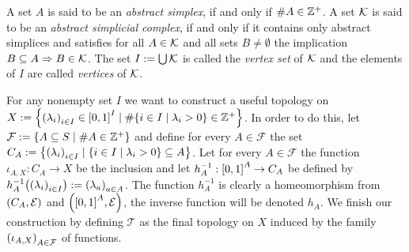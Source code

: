 \begin{definition}
	A set $A$ is said to be an \textit{abstract simplex}, if and only if $\# A \in \Z^+$. A set $\abcom$ is said to be an \textit{abstract simplicial complex}, if and only if it contains only abstract simplices and satisfies for all $A \in \abcom$ and all sets $B \neq \emptyset$ the implication $B \subseteq A \Rightarrow B \in \abcom$. The set $I := \bigcup \abcom$ is called the \textit{vertex set} of $\abcom$ and the elements of $I$ are called \textit{vertices} of $\abcom$. 
\end{definition}


\begin{example}\label{example:top_on_prod}
 	For any nonempty set $I$ we want to construct a useful topology on $X:= \Bbraces{\pbraces{\lambda_i}_{i \in I} \in \bbraces{0,1}^I \mid \card{\Bbraces{i \in I \mid \lambda_i > 0}} \in \Z^+}$. In order to do this, let $\mathcal{F} := \Bbraces{A \subseteq S \mid \card{A} \in \Z^+}$ and define for every $A \in \mathcal{F}$ the set $C_A := \Bbraces{\pbraces{\lambda_i}_{i \in I} \mid \Bbraces{i \in I \mid \lambda_i > 0} \subseteq A}$. Let for every $A \in \mathcal{F}$ the function $\iota_{A,X}: C_A \to X$ be the inclusion and let $h_A^{-1}: \bbraces{0,1}^A \to C_A$ be defined by $h_A^{-1}\pbraces{\pbraces{\lambda_i}_{i \in I}} := \pbraces{\lambda_a}_{a \in A}$. The function $h_A^{-1}$ is clearly a homeomorphism from $\eucl[C_A]$ and $\eucl[\bbraces{0,1}^A]$, the inverse function will be denoted $h_A$. We finish our construction by defining $\mathcal{T}$ as the final topology on $X$ induced by the family $\pbraces{\iota_{A,X}}_{A \in \mathcal{F}}$ of functions. 
\end{example} 


